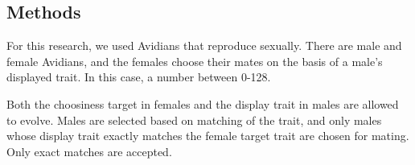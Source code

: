\subsection{Methods}

For this research, we used Avidians that reproduce sexually. There are male and female Avidians, and the females choose their mates on the basis of a male’s displayed trait. In this case, a number between 0-128.

Both the choosiness target in females and the display trait in males are allowed to evolve. Males are selected based on matching of the trait, and only males whose display trait exactly matches the female target trait are chosen for mating. Only exact matches are accepted.